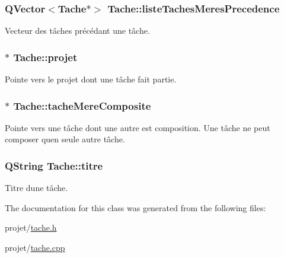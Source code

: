 \subsubsection[{liste\+Taches\+Meres\+Precedence}]{\setlength{\rightskip}{0pt plus 5cm}Q\+Vector$<${\bf Tache}$\ast$$>$ Tache\+::liste\+Taches\+Meres\+Precedence\hspace{0.3cm}{\ttfamily [protected]}}\label{class_tache_a0f73920789e27b7c2aeb47d171d5e543}
Vecteur des tâches précédant une tâche. \hypertarget{class_tache_a0c6d513a2a376b18cb73ab726fe4dec1}{}
\subsubsection[{projet}]{$\ast$ Tache\+::projet\hspace{0.3cm}{\ttfamily [protected]}}\label{class_tache_a0c6d513a2a376b18cb73ab726fe4dec1}
Pointe vers le projet dont une tâche fait partie. \hypertarget{class_tache_a62e6fe2722630c7bdf9a4a6a42364a19}{}
\subsubsection[{tache\+Mere\+Composite}]{$\ast$ Tache\+::tache\+Mere\+Composite\hspace{0.3cm}{\ttfamily [protected]}}\label{class_tache_a62e6fe2722630c7bdf9a4a6a42364a19}
Pointe vers une tâche dont une autre est composition. Une tâche ne peut composer qu\textquotesingle{}en seule autre tâche. \hypertarget{class_tache_a1d3d20046c0c4cc8482f71bb555b79cf}{}
\subsubsection[{titre}]{\setlength{\rightskip}{0pt plus 5cm}Q\+String Tache\+::titre\hspace{0.3cm}{\ttfamily [protected]}}\label{class_tache_a1d3d20046c0c4cc8482f71bb555b79cf}
Titre d\textquotesingle{}une tâche. 

The documentation for this class was generated from the following files\+:\begin{DoxyCompactItemize}
\item 
projet/\hyperlink{tache_8h}{tache.\+h}\item 
projet/\hyperlink{tache_8cpp}{tache.\+cpp}\end{DoxyCompactItemize}
